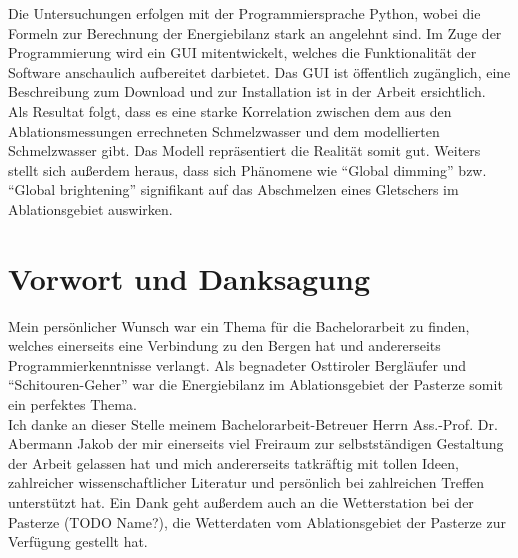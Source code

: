 \documentclass[12pt,a4paper]{article}
\begin{document}
Die Untersuchungen erfolgen mit der Programmiersprache Python, wobei die Formeln zur Berechnung der Energiebilanz stark an \cite[153-157]{ThePhysicsOfGlaciers} angelehnt sind. Im Zuge der Programmierung wird ein GUI mitentwickelt, welches die Funktionalität der Software anschaulich aufbereitet darbietet. Das GUI ist öffentlich zugänglich, eine Beschreibung zum Download und zur Installation ist in der Arbeit ersichtlich.\\

Als Resultat folgt, dass es eine starke Korrelation zwischen dem aus den Ablationsmessungen errechneten Schmelzwasser und dem modellierten Schmelzwasser gibt. Das Modell repräsentiert die Realität somit gut. Weiters stellt sich außerdem heraus, dass sich Phänomene wie ``Global dimming'' bzw. ``Global brightening'' signifikant auf das Abschmelzen eines Gletschers im Ablationsgebiet auswirken.\\


\pagebreak
\section*{Vorwort und Danksagung}
Mein persönlicher Wunsch war ein Thema für die Bachelorarbeit zu finden, welches einerseits eine Verbindung zu den Bergen hat und andererseits Programmierkenntnisse verlangt. Als begnadeter Osttiroler Bergläufer und ``Schitouren-Geher'' war die Energiebilanz im Ablationsgebiet der Pasterze somit ein perfektes Thema.\\

Ich danke an dieser Stelle meinem Bachelorarbeit-Betreuer Herrn Ass.-Prof. Dr. Abermann Jakob der mir einerseits viel Freiraum zur selbstständigen Gestaltung der Arbeit gelassen hat und mich andererseits tatkräftig mit tollen Ideen, zahlreicher wissenschaftlicher Literatur und persönlich bei zahlreichen Treffen unterstützt hat. Ein Dank geht außerdem auch an die Wetterstation bei der Pasterze (TODO Name?), die Wetterdaten vom Ablationsgebiet der Pasterze zur Verfügung gestellt hat.


\pagebreak

\tableofcontents
\vspace{1cm}

\pagebreak
\listoffigures
\vspace{1cm}

\pagebreak
\listoftables
\vspace{1cm}


\pagebreak
{}  
\setcounter{page}{1}
\end{document}
